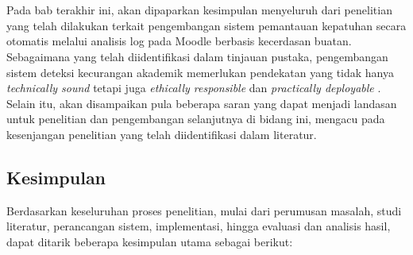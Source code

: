 \chapter{\babLima} %
\label{bab:5} %
Pada bab terakhir ini, akan dipaparkan kesimpulan menyeluruh dari penelitian yang telah dilakukan terkait pengembangan sistem pemantauan kepatuhan secara otomatis melalui analisis log pada Moodle berbasis kecerdasan buatan. Sebagaimana yang telah diidentifikasi dalam tinjauan pustaka, pengembangan sistem deteksi kecurangan akademik memerlukan pendekatan yang tidak hanya \textit{technically sound} tetapi juga \textit{ethically responsible} dan \textit{practically deployable} \cite{Gasevic2015}. Selain itu, akan disampaikan pula beberapa saran yang dapat menjadi landasan untuk penelitian dan pengembangan selanjutnya di bidang ini, mengacu pada kesenjangan penelitian yang telah diidentifikasi dalam literatur.

\section{Kesimpulan}
\label{sec:kesimpulan_bab5}
Berdasarkan keseluruhan proses penelitian, mulai dari perumusan masalah, studi literatur, perancangan sistem, implementasi, hingga evaluasi dan analisis hasil, dapat ditarik beberapa kesimpulan utama sebagai berikut:

